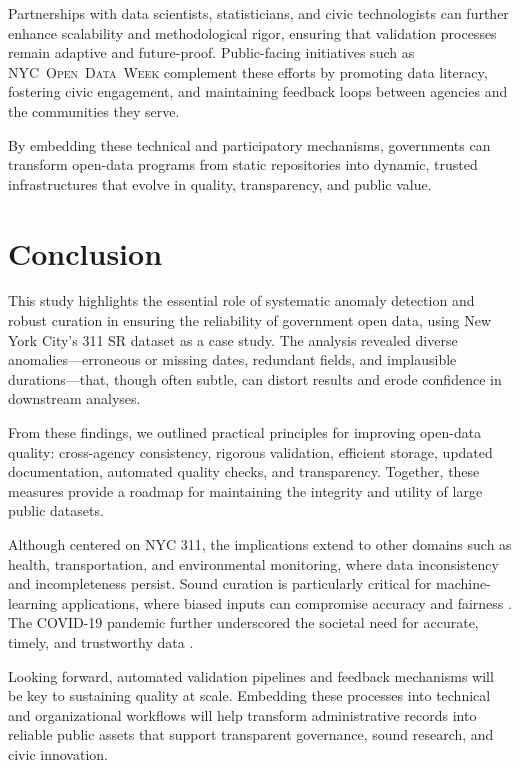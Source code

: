 \documentclass[linenumber]{jdsart}
\begin{document}
Partnerships with data scientists, statisticians, and civic technologists can 
further enhance scalability and methodological rigor, ensuring that validation 
processes remain adaptive and future-proof.  Public-facing initiatives such as 
\textsc{NYC~Open~Data~Week} complement these efforts by promoting data 
literacy, fostering civic engagement, and maintaining feedback loops between 
agencies and the communities they serve.

By embedding these technical and participatory mechanisms, governments can 
transform open-data programs from static repositories into dynamic, trusted 
infrastructures that evolve in quality, transparency, and public value.



\section{Conclusion}
\label{sec:conclusion}
This study highlights the essential role of systematic anomaly detection and 
robust curation in ensuring the reliability of government open data, using 
New York City’s \textsc{311 SR} dataset as a case study. 
The analysis revealed diverse anomalies—erroneous or missing dates, redundant 
fields, and implausible durations—that, though often subtle, can distort 
results and erode confidence in downstream analyses.

From these findings, we outlined practical principles for improving open-data 
quality: cross-agency consistency, rigorous validation, efficient storage, 
updated documentation, automated quality checks, and transparency. 
Together, these measures provide a roadmap for maintaining the integrity and 
utility of large public datasets.

Although centered on \textsc{NYC 311}, the implications extend to other 
domains such as health, transportation, and environmental monitoring, where 
data inconsistency and incompleteness persist. 
Sound curation is particularly critical for machine-learning applications, 
where biased inputs can compromise accuracy and fairness 
\citep{rahm2000data,geiger2020garbage}. 
The COVID-19 pandemic further underscored the societal need for accurate, 
timely, and trustworthy data 
\citep{worby2020face,khemasuwan2021applications}.

Looking forward, automated validation pipelines and feedback mechanisms will 
be key to sustaining quality at scale. 
Embedding these processes into technical and organizational workflows will 
help transform administrative records into reliable public assets that 
support transparent governance, sound research, and civic innovation.
\end{document}
